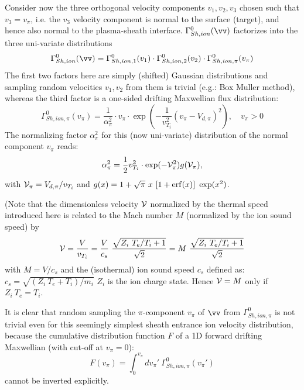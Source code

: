 Consider now the three orthogonal velocity components $v_1,v_2,v_3$ chosen such that $v_3 = v_\pi$, i.e. the $v_3$ velocity component is normal
to the surface (target), and hence also normal to the plasma-sheath interface.
$\Gamma^0_{Sh,ion}(\vv)$ factorizes into the three uni-variate distributions
\begin{equation}
\Gamma^0_{Sh,ion}(\vv)=\Gamma^0_{Sh,ion,1}(v_1)\cdot \Gamma^0_{Sh,ion,2}(v_2) \cdot \Gamma^0_{Sh,ion,\pi}(v_\pi)
\end{equation}
The first two factors here are simply (shifted) Gaussian distributions and sampling random velocities $v_1, v_2$ from them is trivial (e.g.: Box Muller method),
whereas the third factor is a one-sided drifting Maxwellian flux distribution:
\begin{equation}
\Gamma^0_{Sh,ion,\pi}(v_\pi)   = \frac{1}{\alpha^2_\pi}   \cdot   v_{\pi}   \cdot
  \exp \left ( - \frac{1}{v_{T_i}^2}
(v_\pi - V_{d,\pi} )^2  \right )    , \quad
v_{\pi} > 0
\end{equation}
The normalizing factor $\alpha_{\pi}^2$ for this (now uni-variate) distribution of the normal component  $v_\pi$
  reads:
\begin{equation}
\alpha_{\pi}^2   =  \frac12 v_{T_i}^2  \cdot  \exp(-{\cal V}^2_{\pi} )
   g({\cal V}_{\pi} )  ,
\label{eq1.27}
\end{equation}
with ${\cal V}_{\pi} = V_{d,\pi}/   v_{T_i} $ and $
g(x)   =   1   +   \sqrt{\pi} ~  x ~  [1 + {\rm erf}(x)] ~  \exp(x^2
)$.

(Note that the dimensionless velocity $\cal V$ normalized by the thermal speed introduced here is related to the Mach number $M$
(normalized by the ion sound speed) by
\begin{equation}\label{normfac}
{\cal V} = \frac{V}{v_{T_i}} = \frac{V}{c_s}~ \frac{\sqrt{Z_i~T_e/T_i+1}}{\sqrt{2}} = M ~\frac{\sqrt{Z_i~T_e/T_i+1}}{\sqrt{2}}
\end{equation}
with $M = V/c_s$ and the (isothermal) ion sound speed $c_s$ defined as: $c_s=\sqrt{(Z_i~T_e+T_i)/m_i}$
$Z_i$ is the ion charge state.
Hence ${\cal V} = M$ only if $Z_i~T_e=T_i$.

It is clear that random sampling the $\pi$-component $v_{\pi}$ of $\vv $ from
$\Gamma^0_{Sh,ion,\pi}$ is not trivial even for this seemingly simplest sheath entrance ion velocity distribution,  because the cumulative
distribution function $F$ of a 1D forward drifting Maxwellian (with
cut-off at $v_{\pi}=0$):
\begin{equation}
F ( v_{\pi} )   = \int_{0}^{v_{\pi}} dv_{\pi} ' \
\Gamma^{0}_{Sh,ion,\pi} ( v_{\pi} ' ) \label{eq1.25}
\end{equation}
cannot be inverted explicitly.


